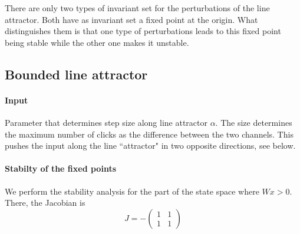 \documentclass{article} %
\newcounter{ct}
\newcommand{\win}{\vW_{\text{in}}}
\newcommand{\wout}{\vW_{\text{out}}}
\newcommand{\bout}{\vb_{\text{out}}}
\theoremstyle{definition}
\theoremstyle{remark}
\begin{document}
There are only two types of invariant set for the perturbations of the line attractor. Both have as invariant set a fixed point at the origin. What distinguishes them is that one type of perturbations leads to this fixed point being stable while the other one makes it unstable.



\subsection{Bounded line attractor}\label{sec:supp:bla}

\paragraph{Input}
Parameter that determines step size along line attractor $\alpha$.
The size determines the maximum number of clicks as the difference between the two channels. 
This pushes the input along the line ``attractor" in two opposite directions, %
see below.

%



\paragraph{Stabilty of the fixed points}
We perform the stability analysis for the part of the state space where $Wx>0$.
There, the Jacobian is
\begin{equation}
J = -
\begin{pmatrix}
1  &  1 \\
1  &  1
\end{pmatrix}
\end{equation}
\end{document}
